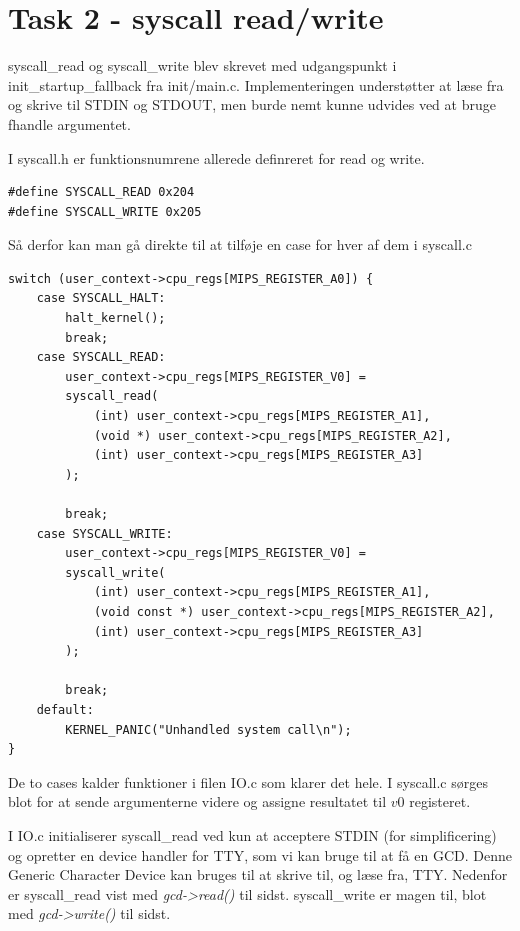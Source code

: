 \documentclass[11pt]{article}
\begin{document}
\section*{Task 2 - syscall read/write}

syscall_read og syscall_write blev skrevet med udgangspunkt i init_startup_fallback fra init/main.c. Implementeringen understøtter at læse fra og skrive til STDIN og STDOUT, men burde nemt kunne udvides ved at bruge fhandle argumentet.

I syscall.h er funktionsnumrene allerede definreret for read og write.
\begin{lstlisting}[style=customc]
#define SYSCALL_READ 0x204
#define SYSCALL_WRITE 0x205
\end{lstlisting} 

Så derfor kan man gå direkte til at tilføje en case for hver af dem i syscall.c

\begin{lstlisting}[style=customc]
switch (user_context->cpu_regs[MIPS_REGISTER_A0]) {
    case SYSCALL_HALT:
        halt_kernel();
        break;
    case SYSCALL_READ:
        user_context->cpu_regs[MIPS_REGISTER_V0] =
        syscall_read(
            (int) user_context->cpu_regs[MIPS_REGISTER_A1],
            (void *) user_context->cpu_regs[MIPS_REGISTER_A2],
            (int) user_context->cpu_regs[MIPS_REGISTER_A3]
        );

        break;
    case SYSCALL_WRITE:
        user_context->cpu_regs[MIPS_REGISTER_V0] =
        syscall_write(
            (int) user_context->cpu_regs[MIPS_REGISTER_A1],
            (void const *) user_context->cpu_regs[MIPS_REGISTER_A2],
            (int) user_context->cpu_regs[MIPS_REGISTER_A3]
        );

        break;
    default:
        KERNEL_PANIC("Unhandled system call\n");
}
\end{lstlisting}

De to cases kalder funktioner i filen IO.c som klarer det hele. I syscall.c
sørges blot for at sende argumenterne videre og assigne resultatet til $v0$
registeret.

I IO.c initialiserer syscall_read ved kun at acceptere STDIN (for simplificering)
og opretter en device handler for TTY, som vi kan bruge til at få en GCD. Denne 
Generic Character Device kan bruges til at skrive til, og læse fra, TTY. Nedenfor
er syscall_read vist med \emph{gcd->read()} til sidst. syscall_write er magen til,
blot med \emph{gcd->write()} til sidst.
\end{document}
